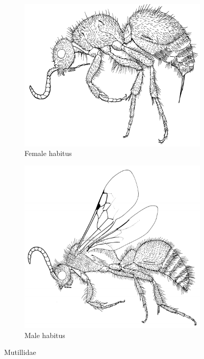 \documentclass[letterpaper, 11pt]{article}
\begin{document}
\begin{figure}[ht!]
    \centering
    \begin{subfigure}[ht!]{0.45\textwidth}
        \includegraphics[width=\textwidth]{MutillidHabitus}
        \caption{Female habitus \citep[][Fig. 63]{goulet1993hymenoptera}}
        \label{fig:mutillid1}
    \end{subfigure}
    \qquad
    \begin{subfigure}[ht!]{0.45\textwidth}
        \includegraphics[width=\textwidth]{MaleMutillidHabitus}
        \caption{Male habitus \citep[][Fig. 64]{goulet1993hymenoptera}}
        \label{fig:mutillid2}
    \end{subfigure}
    \caption{Mutillidae}\label{fig:mutillids}
\end{figure}
\end{document}

